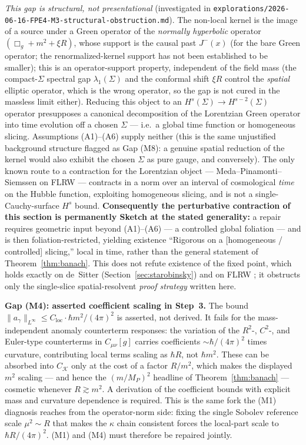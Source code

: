 \documentclass[12pt,a4paper]{article}
\begin{document}
\emph{This gap is structural, not presentational} (investigated in
\texttt{explorations/2026-06-16-FPE4-M3-structural-obstruction.md}). The non-local
kernel is the image of a source under a Green operator of the \emph{normally hyperbolic}
operator $(\Box_g + m^2 + \xi R)$, whose support is the causal past $J^-(x)$ (for the
bare Green operator; the renormalized-kernel support has not been established to be
smaller); this is an operator-support property, independent of the field mass (the compact-$\Sigma$ spectral
gap $\lambda_1(\Sigma)$ and the conformal shift $\xi R$ control the \emph{spatial}
elliptic operator, which is the wrong operator, so the gap is not cured in the massless
limit either). Reducing this object to an $H^s(\Sigma)\to H^{s-2}(\Sigma)$ operator
presupposes a canonical decomposition of the Lorentzian Green operator into time
evolution off a chosen $\Sigma$ --- i.e.\ a global time function or homogeneous slicing.
Assumptions (A1)--(A6) supply neither (this is the same unjustified background structure
flagged as Gap (M8): a genuine spatial reduction of the kernel would also exhibit the
chosen $\Sigma$ as pure gauge, and conversely). The only known route to a contraction for
the Lorentzian object --- Meda--Pinamonti--Siemssen on FLRW
\cite{meda_pinamonti_siemssen,pinamonti_siemssen} --- contracts in a norm over an interval
of cosmological \emph{time} on the Hubble function, exploiting homogeneous slicing, and is
not a single-Cauchy-surface $H^s$ bound. \textbf{Consequently the perturbative contraction
of this section is permanently Sketch at the stated generality:} a repair requires
geometric input beyond (A1)--(A6) --- a controlled global foliation --- and is then
foliation-restricted, yielding existence ``Rigorous on a [homogeneous / controlled]
slicing,'' local in time, rather than the general statement of Theorem~\ref{thm:banach}.
This does not refute existence of the fixed point, which holds exactly on de~Sitter
(Section~\ref{sec:starobinsky}) and on FLRW \cite{meda_pinamonti_siemssen}; it obstructs only
the single-slice spatial-resolvent \emph{proof strategy} written here.

\smallskip\noindent\textbf{Gap (M4): asserted coefficient scaling in Step~3.}
The bound $\|a_\gamma\|_{L^\infty} \leq C_{\mathrm{loc}}\cdot\hbar m^2/(4\pi)^2$ is
asserted, not derived. It fails for the mass-independent anomaly counterterm responses:
the variation of the $R^2$-, $C^2$-, and Euler-type counterterms in $C_{\mu\nu}[g]$
carries coefficients $\sim \hbar/(4\pi)^2$ times curvature, contributing local terms
scaling as $\hbar R$, not $\hbar m^2$. These can be absorbed into $C_{\mathcal{K}}$ only
at the cost of a factor $R/m^2$, which makes the displayed $m^2$ scaling --- and hence
the $(m/M_P)^2$ headline of Theorem~\ref{thm:banach} --- cosmetic whenever
$R \gtrsim m^2$. A derivation of the coefficient bounds with explicit mass and curvature
dependence is required. This is the same fork the (M1) diagnosis reaches from the
operator-norm side: fixing the single Sobolev reference scale $\mu^2\sim R$ that makes the
$\kappa$ chain consistent forces the local-part scale to $\hbar R/(4\pi)^2$. (M1) and (M4)
must therefore be repaired jointly.
\end{document}
